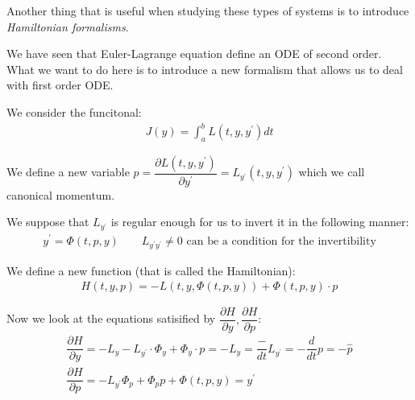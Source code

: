 \par\bigskip
\noindent Another thing that is useful when studying these types of systems is to introduce \textit{Hamiltonian formalisms}.\par
\noindent We have seen that Euler-Lagrange equation define an ODE of second order. What we want to do here is to introduce a new formalism that allows us to deal with first order ODE. %
\par\bigskip
\noindent We consider the funcitonal:
\begin{equation*}
  \begin{gathered}
    J(y) = \int_{a}^{b}L(t,y,y^{\prime}) dt
  \end{gathered}
\end{equation*}\par
\noindent We define a new variable $p = \dfrac{\partial L(t,y,y^{\prime})}{\partial y^{\prime}} = L_{y^{\prime}}(t,y,y^{\prime})$ which we call canonical momentum.\par
\noindent We suppose that $L_{y^{\prime}}$ is regular enough for us to invert it in the following manner:
\begin{equation*}
  \begin{gathered}
    y^{\prime} = \Phi(t,p,y)\qquad L_{y^{\prime}y^{\prime}}\neq0\text{ can be a condition for the invertibility}
  \end{gathered}
\end{equation*}
\par\bigskip
\noindent We define a new function (that is called the Hamiltonian):
\begin{equation*}
  \begin{gathered}
    H(t, y, p) = -L(t,y,\Phi(t,p,y)) + \Phi(t,p,y)\cdot p
  \end{gathered}
\end{equation*}\par
\noindent Now we look at the equations satisified by $\dfrac{\partial H}{\partial  y}, \dfrac{\partial H}{\partial  p}$:
\begin{equation*}
  \begin{gathered}
    \dfrac{\partial  H}{\partial  y} = -L_y-L_{y^{\prime}}\cdot\Phi_y+\Phi_y\cdot p = -L_y = \dfrac{-}{dt}L_{y^{\prime}} = -\dfrac{d}{dt}p = -\hat{p}\\
    \dfrac{\partial H}{\partial p} = -L_{y^{\prime}}\Phi_p+\Phi_pp+\Phi(t,p,y) = y^{\prime}
  \end{gathered}
\end{equation*}\par
